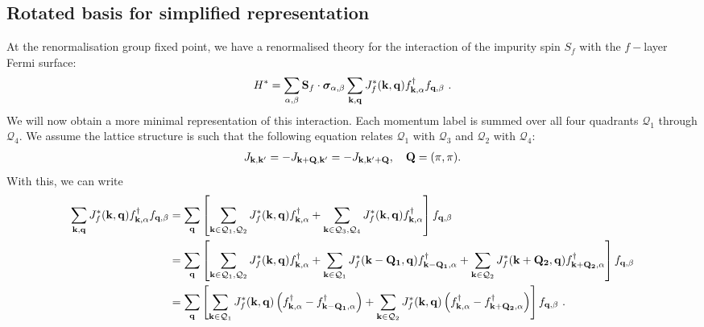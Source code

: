 \subsection*{Rotated basis for simplified representation}
At the renormalisation group fixed point, we have a renormalised theory for the interaction of the impurity spin \(S_f\) with the \(f-\)layer Fermi surface:
\begin{equation}\begin{aligned}
	H^* = \sum_{\alpha,\beta}{\bf S}_f\cdot{\boldsymbol\sigma}_{\alpha,\beta}\sum_{{\bf k}, {\bf q}} J_f^*({\bf k},{\bf q}) f^\dagger_{{\bf k},\alpha}f_{{\bf q},\beta}~.
\end{aligned}\end{equation}
We will now obtain a more minimal representation of this interaction. Each momentum label is summed over all four quadrants \(\mathcal{Q}_1\) through \(\mathcal{Q}_4\). We assume the lattice structure is such that the following equation relates \(\mathcal{Q}_1\) with \(\mathcal{Q}_3\) and \(\mathcal{Q}_2\) with \(\mathcal{Q}_4\):
\begin{equation}
\begin{aligned}
J_{{\bf k},{\bf k'}}= -J_{{\bf k}+{\bf Q},{\bf k'}}=-J_{{\bf k},{\bf k'}+{\bf Q}}, \quad {\bf Q} = (\pi,\pi).
\end{aligned}
\end{equation}
With this, we can write
\begin{equation}\begin{aligned}
	\sum_{{\bf k}, {\bf q}} J_f^*({\bf k},{\bf q}) f^\dagger_{{\bf k},\alpha}f_{{\bf q},\beta} 
	&= \sum_{\bf q}\left[\sum_{{\bf k} \in \mathcal{Q}_1,\mathcal{Q}_2} J_f^*({\bf k},{\bf q}) f^\dagger_{{\bf k},\alpha} + \sum_{{\bf k} \in \mathcal{Q}_3,\mathcal{Q}_4} J_f^*({\bf k},{\bf q}) f^\dagger_{{\bf k},\alpha}\right] f_{{\bf q},\beta}\\
	&= \sum_{\bf q}\left[\sum_{{\bf k} \in \mathcal{Q}_1,\mathcal{Q}_2} J_f^*({\bf k},{\bf q}) f^\dagger_{{\bf k},\alpha} + \sum_{{\bf k} \in \mathcal{Q}_1} J_f^*({\bf k - Q_1},{\bf q}) f^\dagger_{{\bf k - Q_1},\alpha} + \sum_{{\bf k} \in \mathcal{Q}_2} J_f^*({\bf k + Q_2},{\bf q}) f^\dagger_{{\bf k + Q_2},\alpha}\right] f_{{\bf q},\beta}\\
	&= \sum_{\bf q}\left[\sum_{{\bf k} \in \mathcal{Q}_1} J_f^*({\bf k},{\bf q}) \left(f^\dagger_{{\bf k},\alpha} - f^\dagger_{{\bf k - Q_1},\alpha}\right) + \sum_{{\bf k} \in \mathcal{Q}_2} J_f^*({\bf k},{\bf q}) \left(f^\dagger_{{\bf k},\alpha} - f^\dagger_{{\bf k + Q_2},\alpha}\right) \right] f_{{\bf q},\beta}~.
\end{aligned}\end{equation}

